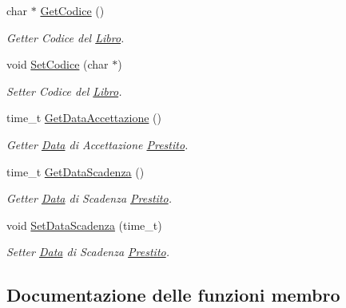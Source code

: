 \begin{DoxyCompactItemize}
char $\ast$ \mbox{\hyperlink{class_prestito_ab7c954c58fe1a284c29af14acdf2a05f}{Get\+Codice}} ()
\begin{DoxyCompactList}\small\item\em Getter Codice del \mbox{\hyperlink{class_libro}{Libro}}. \end{DoxyCompactList}\item 
\mbox{\label{class_prestito_a9cd58ea6672230249664e8453df67de9}} 
void \mbox{\hyperlink{class_prestito_a9cd58ea6672230249664e8453df67de9}{Set\+Codice}} (char $\ast$)
\begin{DoxyCompactList}\small\item\em Setter Codice del \mbox{\hyperlink{class_libro}{Libro}}. \end{DoxyCompactList}\item 
time\+\_\+t \mbox{\hyperlink{class_prestito_afacba47375912f9d86b44cfae6bfd138}{Get\+Data\+Accettazione}} ()
\begin{DoxyCompactList}\small\item\em Getter \mbox{\hyperlink{class_data}{Data}} di Accettazione \mbox{\hyperlink{class_prestito}{Prestito}}. \end{DoxyCompactList}\item 
time\+\_\+t \mbox{\hyperlink{class_prestito_aefa87f49dcf99abf28ae20ebdb5f0325}{Get\+Data\+Scadenza}} ()
\begin{DoxyCompactList}\small\item\em Getter \mbox{\hyperlink{class_data}{Data}} di Scadenza \mbox{\hyperlink{class_prestito}{Prestito}}. \end{DoxyCompactList}\item 
\mbox{\label{class_prestito_a8f4ddd024b8ffb5be270a190cb429ed9}} 
void \mbox{\hyperlink{class_prestito_a8f4ddd024b8ffb5be270a190cb429ed9}{Set\+Data\+Scadenza}} (time\+\_\+t)
\begin{DoxyCompactList}\small\item\em Setter \mbox{\hyperlink{class_data}{Data}} di Scadenza \mbox{\hyperlink{class_prestito}{Prestito}}. \end{DoxyCompactList}\end{DoxyCompactItemize}


\subsection{Documentazione delle funzioni membro}
\mbox{\label{class_prestito_ab7c954c58fe1a284c29af14acdf2a05f}} 
